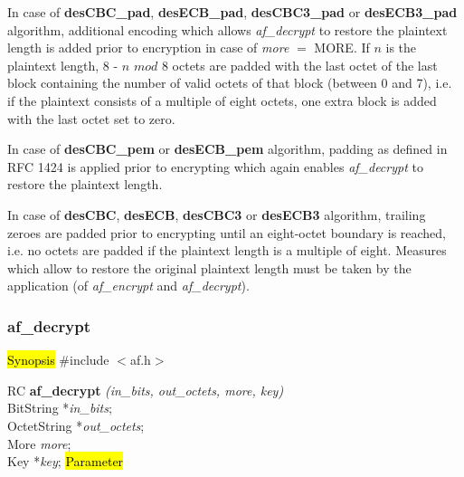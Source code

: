    In case of {\bf desCBC\_pad}, {\bf desECB\_pad}, {\bf desCBC3\_pad} or 
   {\bf desECB3\_pad} algorithm, additional encoding which allows 
   {\em af\_decrypt} to restore the plaintext length is added prior
   to encryption in case of {\em more} $=$ MORE. If $n$ is the plaintext length,
   8 - $n$ $mod$ 8 octets are padded with
   the last octet of the last block containing the number of 
   valid octets of that block (between 0 and 7), i.e. if the plaintext consists 
   of a multiple of eight octets, one extra block is added with the last octet set to zero.

   In case of {\bf desCBC\_pem} or {\bf desECB\_pem} algorithm, 
   padding as defined in RFC 1424 is applied prior to encrypting
   which again enables {\em af\_decrypt} to restore the plaintext length.

   In case of {\bf desCBC}, {\bf desECB}, {\bf desCBC3} or {\bf desECB3} algorithm,
   trailing zeroes are padded prior to encrypting until an eight-octet boundary is reached, i.e.
   no octets are padded if the plaintext length is a multiple of eight.
   Measures which allow to restore the original plaintext length must
   be taken by the application (of {\em af\_encrypt} and {\em af\_decrypt}).

\subsubsection{af\_decrypt}
\label{af_decrypt}
\hl{Synopsis}
\#include $<$af.h$>$

RC {\bf af\_decrypt} {\em (in\_bits, out\_octets, more, key)} \\
BitString *{\em in\_bits}; \\
OctetString *{\em out\_octets}; \\
More {\em more}; \\
Key *{\em key};
\hl{Parameter}




